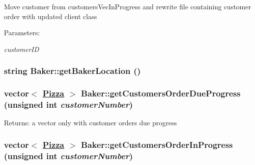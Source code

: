 Move customer from customers\-Vec\-In\-Progress and rewrite file containing customer order with updated client class

\begin{Desc}
\item[Parameters:]
\begin{description}
\item[{\em customer\-ID}]\end{description}
\end{Desc}
\hypertarget{class_baker_363b0d0c242923ca3a76ebd4e608cc2d}{
\subsubsection[getBakerLocation]{\setlength{\rightskip}{0pt plus 5cm}string Baker::get\-Baker\-Location ()}}
\label{class_baker_363b0d0c242923ca3a76ebd4e608cc2d}


\hypertarget{class_baker_7c9256e53372bd3a698e40cf64003c50}{
\subsubsection[getCustomersOrderDueProgress]{\setlength{\rightskip}{0pt plus 5cm}vector$<$ \hyperlink{class_pizza}{Pizza} $>$ Baker::get\-Customers\-Order\-Due\-Progress (unsigned int {\em customer\-Number})}}
\label{class_baker_7c9256e53372bd3a698e40cf64003c50}


\begin{Desc}
\item[Returns:]a vector only with customer orders due progress \end{Desc}
\hypertarget{class_baker_96a7c1ec2dc23919a4e7ca8c399476e1}{
\subsubsection[getCustomersOrderInProgress]{\setlength{\rightskip}{0pt plus 5cm}vector$<$ \hyperlink{class_pizza}{Pizza} $>$ Baker::get\-Customers\-Order\-In\-Progress (unsigned int {\em customer\-Number})}}
\label{class_baker_96a7c1ec2dc23919a4e7ca8c399476e1}


